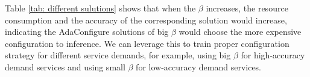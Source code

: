 Table \ref{tab: different sulutions} shows that when the $\beta$ increases, the resource consumption and the accuracy of the corresponding solution would increase, indicating the AdaConfigure solutions of big $\beta$ would choose the more expensive configuration to inference. We can leverage this to train proper configuration strategy for different service demands, for example, using big $\beta$ for high-accuracy demand services and using small $\beta$ for low-accuracy demand services. 
%

